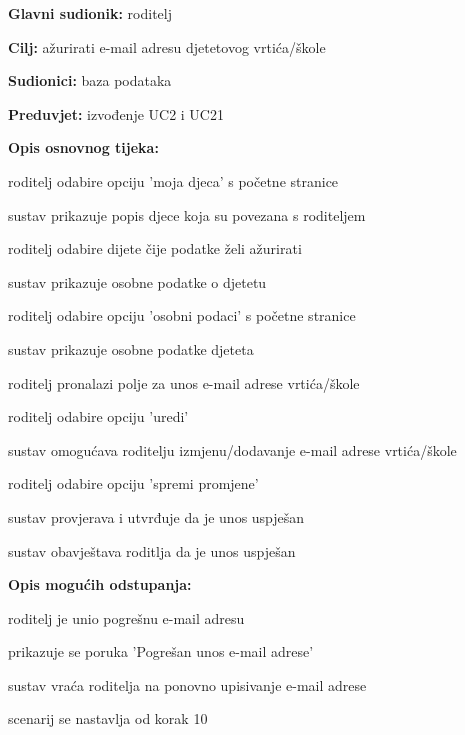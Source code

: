 					\noindent {}
					\begin{packed_item}
	
						\item \textbf{Glavni sudionik: }roditelj
						\item  \textbf{Cilj:} ažurirati e-mail adresu djetetovog vrtića/škole
						\item  \textbf{Sudionici:} baza podataka
						\item  \textbf{Preduvjet:} izvođenje UC2 i UC21
						\item  \textbf{Opis osnovnog tijeka:}
						
						\item[] \begin{packed_enum}
							\item roditelj odabire opciju 'moja djeca' s početne stranice
							\item sustav prikazuje popis djece koja su povezana s roditeljem
							\item roditelj odabire dijete čije podatke želi ažurirati
							\item sustav prikazuje osobne podatke o djetetu
							\item roditelj odabire opciju 'osobni podaci' s početne stranice
							\item sustav prikazuje osobne podatke djeteta
							\item roditelj pronalazi polje za unos e-mail adrese vrtića/škole
							\item roditelj odabire opciju 'uredi'
							\item sustav omogućava roditelju izmjenu/dodavanje e-mail adrese vrtića/škole
							\item roditelj odabire opciju 'spremi promjene'
							\item sustav provjerava i utvrđuje da je unos uspješan
							\item sustav obavještava roditlja da je unos uspješan
			
						\end{packed_enum}
						
						\item  \textbf{Opis mogućih odstupanja:}
						
						\item[] \begin{packed_item}
							\item[11.a] roditelj je unio pogrešnu e-mail adresu 
							\item[] 
							\begin{packed_enum} 
								\item prikazuje se poruka 'Pogrešan unos e-mail adrese'
								\item sustav vraća roditelja na ponovno upisivanje e-mail adrese
								\item scenarij se nastavlja od korak 10
								
							\end{packed_enum}
						\end{packed_item}
						
					\end{packed_item}


